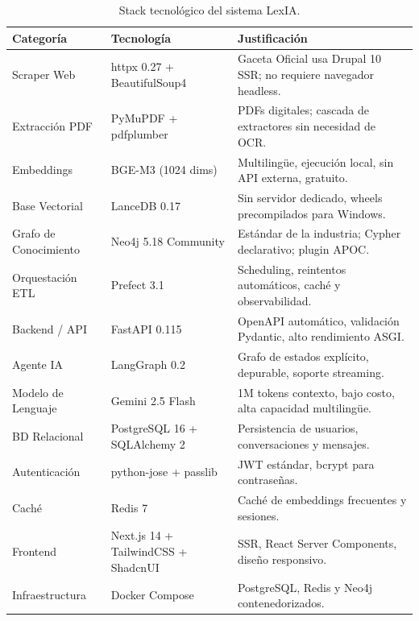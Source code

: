 \documentclass[12pt, letterpaper]{report}
\begin{document}
\begin{table}[H]
  \centering
  \renewcommand{\arraystretch}{1.3}
  \caption{Stack tecnol\'{o}gico del sistema LexIA.}
  \label{tab:herramientas_tec}
  \begin{tabular}{|p{}|p{}|p{}|}
  \hline
  \textbf{Categor\'{i}a} & \textbf{Tecnolog\'{i}a} & \textbf{Justificaci\'{o}n} \\ \hline
  Scraper Web & httpx 0.27 + BeautifulSoup4 & Gaceta Oficial usa Drupal 10 SSR; no requiere navegador headless. \\ \hline
  Extracci\'{o}n PDF & PyMuPDF + pdfplumber & PDFs digitales; cascada de extractores sin necesidad de OCR. \\ \hline
  Embeddings & BGE-M3 (1024 dims) & Multiling\"{u}e, ejecuci\'{o}n local, sin API externa, gratuito. \\ \hline
  Base Vectorial & LanceDB 0.17 & Sin servidor dedicado, wheels precompilados para Windows. \\ \hline
  Grafo de Conocimiento & Neo4j 5.18 Community & Est\'{a}ndar de la industria; Cypher declarativo; plugin APOC. \\ \hline
  Orquestaci\'{o}n ETL & Prefect 3.1 & Scheduling, reintentos autom\'{a}ticos, cach\'{e} y observabilidad. \\ \hline
  Backend / API & FastAPI 0.115 & OpenAPI autom\'{a}tico, validaci\'{o}n Pydantic, alto rendimiento ASGI. \\ \hline
  Agente IA & LangGraph 0.2 & Grafo de estados expl\'{i}cito, depurable, soporte streaming. \\ \hline
  Modelo de Lenguaje & Gemini 2.5 Flash & 1M tokens contexto, bajo costo, alta capacidad multiling\"{u}e. \\ \hline
  BD Relacional & PostgreSQL 16 + SQLAlchemy 2 & Persistencia de usuarios, conversaciones y mensajes. \\ \hline
  Autenticaci\'{o}n & python-jose + passlib & JWT est\'{a}ndar, bcrypt para contrase\~{n}as. \\ \hline
  Cach\'{e} & Redis 7 & Cach\'{e} de embeddings frecuentes y sesiones. \\ \hline
  Frontend & Next.js 14 + TailwindCSS + ShadcnUI & SSR, React Server Components, dise\~{n}o responsivo. \\ \hline
  Infraestructura & Docker Compose & PostgreSQL, Redis y Neo4j contenedorizados. \\ \hline
  \end{tabular}
\end{table}
\end{document}
